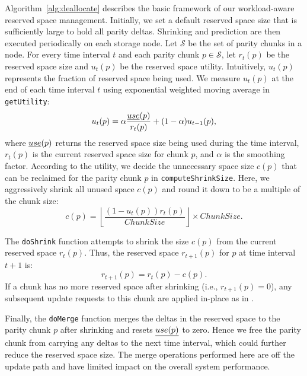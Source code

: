 Algorithm~\ref{alg:deallocate} describes the basic framework of our
workload-aware reserved space management.  Initially, we set a default
reserved space size that
is sufficiently large to hold all parity deltas.  Shrinking and
prediction are then executed periodically on each storage node.  Let
$\mathcal{S}$ be the set of parity chunks in a node. For every time interval
$t$ and each parity chunk $p\in \mathcal{S}$, let $r_t(p)$ be the reserved
space size and $u_t(p)$ be the reserved space utility.   Intuitively, $u_t(p)$
represents the fraction of reserved space being used.  We measure $u_t(p)$ at
the end of each time interval $t$ using exponential weighted moving average
in \texttt{getUtility}:
%
\begin{equation*} \label{eq:utility_now}
    u_t(p)  = \alpha \frac{\emph{use}(p)}{r_{t}(p)} + (1-\alpha)u_{t-1}(p),
\end{equation*} 
%
where $\emph{use}(p)$ returns the reserved space size being used during the
time interval, $r_{t}(p)$ is the current reserved space size for chunk
$p$, and $\alpha$ is the smoothing factor.  
According to the utility, we decide the unnecessary space size $c(p)$ that can
be reclaimed for the parity chunk $p$ in \texttt{computeShrinkSize}.  Here, we
aggressively shrink all unused space $c(p)$ and round it down to be a multiple
of the chunk size:
%
\begin{equation*} \label{eq:shrink_size}
	c(p) = \left\lfloor\frac{(1-u_{t}(p))r_{t}(p)}{ChunkSize}\right\rfloor
	\times ChunkSize.
\end{equation*} 

The \texttt{doShrink} function attempts to shrink the size $c(p)$ from the
current reserved space $r_{t}(p)$. Thus, the reserved space $r_{t+1}(p)$ 
for $p$ at time interval $t+1$ is: 
$$
r_{t+1}(p) = r_{t}(p) - c(p).
$$
%
If a chunk has no more reserved space after shrinking (i.e., $r_{t+1}(p)
= 0$), any subsequent update requests to this chunk are applied in-place as
in \FO.

Finally, the \texttt{doMerge} function merges the deltas in the reserved space
to
the parity chunk $p$ after shrinking and resets $\emph{use(p)}$ to zero. Hence
we free the parity chunk from carrying any deltas to the next time interval,
which could further reduce the reserved space size.  The merge operations
performed here are off the update path and have limited impact on the overall
system performance. 

